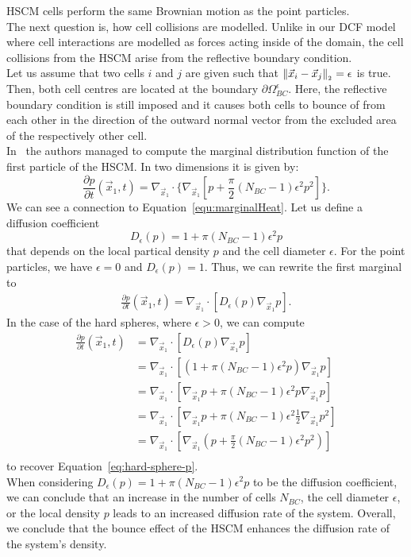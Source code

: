HSCM cells perform the same Brownian motion as the point particles. \\
The next question is, how cell collisions are modelled. 
Unlike in our DCF model where cell interactions are modelled as forces acting inside of the domain, the cell collisions from the HSCM arise from the reflective boundary condition. \\
Let us assume that two cells $i$ and $j$ are given such that $\norm[\vec{x}_i - \vec{x}_j] = \epsilon$ is true. 
Then, both cell centres are located at the boundary $\partial \Omega_{BC}^{\epsilon}$. 
Here, the reflective boundary condition is still imposed and it causes both cells to bounce of from each other in the direction of the outward normal vector from the excluded area of the respectively other cell. \\ 

In~\cite{Bruna2012} the authors managed to compute the marginal distribution function of the first particle of the HSCM. 
In two dimensions it is given by:
\begin{equation}
    \frac{\partial p}{\partial t}(\vec{x}_1, t) = \nabla_{\vec{x}_1} \cdot \{\nabla_{\vec{x}_1}[p + \frac{\pi}{2}(N_{BC} - 1)\epsilon^2 p^2]\}.
    \label{eq:hard-sphere-p}
\end{equation}
We can see a connection to Equation~\ref{equ:marginalHeat}. 
Let us define a diffusion coefficient $$D_{\epsilon}(p) = 1 + \pi(N_{BC}-1)\epsilon^2p$$ that depends on the local partical density $p$ and the cell diameter $\epsilon$. 
For the point particles, we have $\epsilon = 0$ and $D_{\epsilon}(p) = 1$.
Thus, we can rewrite the first marginal to  
\begin{align*}
    \frac{\partial p}{\partial t}(\vec{x}_1, t) = \nabla_{\vec{x}_1} \cdot [D_{\epsilon}(p) \nabla_{\vec{x}_1} p]. 
\end{align*}
In the case of the hard spheres, where $\epsilon > 0$, we can compute
\begin{align*}
    \frac{\partial p}{\partial t}(\vec{x}_1, t) &= \nabla_{\vec{x}_1} \cdot [D_{\epsilon}(p) \nabla_{\vec{x}_1} p] \\  
    &= \nabla_{\vec{x}_1} \cdot [(1 + \pi(N_{BC}-1)\epsilon^2p) \nabla_{\vec{x}_1} p] \\
    &= \nabla_{\vec{x}_1} \cdot [\nabla_{\vec{x}_1} p + \pi(N_{BC}-1)\epsilon^2 p \nabla_{\vec{x}_1} p] \\
    &= \nabla_{\vec{x}_1} \cdot [\nabla_{\vec{x}_1} p + \pi(N_{BC}-1)\epsilon^2 \frac{1}{2}\nabla_{\vec{x}_1} p^2] \\
    &= \nabla_{\vec{x}_1} \cdot [\nabla_{\vec{x}_1} (p + \frac{\pi}{2}(N_{BC}-1)\epsilon^2 p^2)] \\
\end{align*}
to recover Equation~\ref{eq:hard-sphere-p}. \\ 
When considering \( D_\epsilon(p) = 1 + \pi(N_{BC}-1)\epsilon^2p \) to be the diffusion coefficient, we can conclude that an increase in the number of cells \( N_{BC} \), the cell diameter \( \epsilon \), or the local density \( p \) leads to an increased diffusion rate of the system.
Overall, we conclude that the bounce effect of the HSCM enhances the diffusion rate of the system's density.

